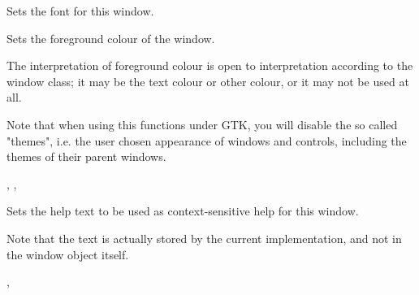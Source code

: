 
Sets the font for this window.





\label{wxwindowsetforegroundcolour}


Sets the foreground colour of the window.




The interpretation of foreground colour is open to interpretation according
to the window class; it may be the text colour or other colour, or it may not
be used at all.

Note that when using this functions under GTK, you will disable the so called "themes",
i.e. the user chosen appearance of windows and controls, including the themes of
their parent windows.


,\rtfsp
{},\rtfsp
{}

\label{wxwindowsethelptext}


Sets the help text to be used as context-sensitive help for this window.

Note that the text is actually stored by the current  implementation,
and not in the window object itself.


, 

\label{wxwindowsetid}


